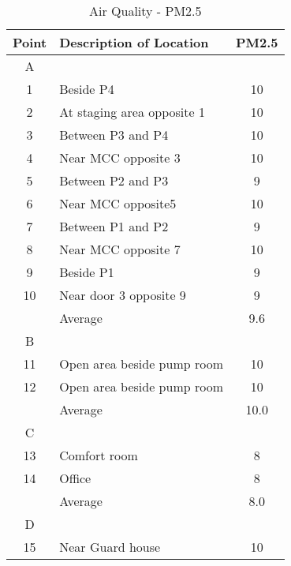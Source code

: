 \begin{table}
	\caption{Air Quality - PM2.5}
	\label{ch047_tbl_pm}
	{\footnotesize
\begin{tabular}{c|l|c}

\hline
Point & Description of Location & PM2.5 \\ 
\hline
A &  &  \\ 
1 & Beside P4 & 10 \\ 
2 & At staging area opposite 1 & 10 \\ 
3 & Between P3 and P4 & 10 \\ 
4 & Near MCC opposite 3 & 10 \\ 
5 & Between P2 and P3 & 9 \\ 
6 & Near MCC opposite5 & 10 \\ 
7 & Between P1 and P2 & 9 \\ 
8 & Near MCC opposite 7 & 10 \\ 
9 & Beside P1 & 9 \\ 
10 & Near door 3 opposite 9 & 9 \\ 
 & Average & 9.6 \\ 
\hline
B &  &  \\ 
11 & Open area beside pump room & 10 \\ 
12 & Open area beside pump room & 10 \\ 
 & Average & 10.0 \\ 
\hline
C &  &  \\ 
13 & Comfort room & 8 \\ 
14 & Office & 8 \\ 
 & Average & 8.0 \\ 
\hline
D &  &  \\ 
15 & Near Guard house & 10 \\ 
\hline

\end{tabular}
}
\end{table}